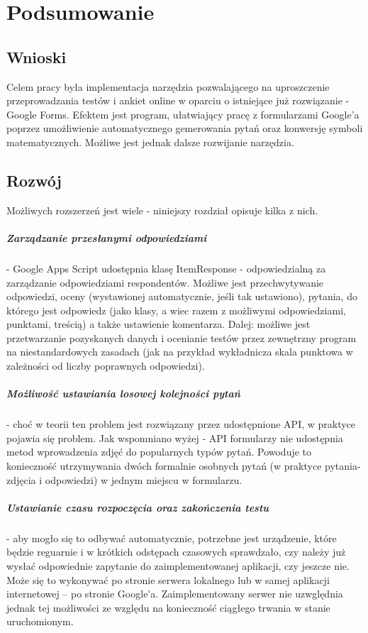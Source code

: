 \chapter{Podsumowanie}%

\section{Wnioski}
Celem pracy była implementacja narzędzia pozwalającego na uproszczenie przeprowadzania testów i ankiet online w oparciu o istniejące już rozwiązanie - Google Forms.  Efektem jest program, ułatwiający pracę z formularzami Google'a poprzez umożliwienie automatycznego gemerowania pytań oraz konwersję symboli matematycznych.  Możliwe jest jednak dalsze rozwijanie narzędzia. 

\section{Rozwój}
Możliwych rozszerzeń jest wiele - niniejszy rozdział opisuje kilka z nich.
\paragraph{Zarządzanie przesłanymi odpowiedziami} - Google Apps Script udostępnia klasę ItemResponse - odpowiedzialną za zarządzanie odpowiedziami respondentów. Możliwe jest przechwytywanie odpowiedzi, oceny (wystawionej automatycznie, jeśli tak ustawiono), pytania, do którego jest odpowiedz (jako klasy, a wiec razem z możliwymi odpowiedziami, punktami, treścią) a także ustawienie komentarza. Dalej: możliwe jest przetwarzanie pozyskanych danych i ocenianie testów przez zewnętrzny program na niestandardowych zasadach (jak na przykład wykładnicza skala punktowa w zależności od liczby poprawnych odpowiedzi).
\paragraph{Możliwość ustawiania losowej kolejności pytań} - choć w teorii ten problem jest rozwiązany przez udostępnione API, w praktyce pojawia się problem. Jak wspomniano wyżej - API formularzy nie udostępnia metod wprowadzenia zdjęć do popularnych typów pytań. Powoduje to konieczność utrzymywania dwóch formalnie osobnych pytań (w praktyce pytania-zdjęcia i odpowiedzi) w jednym miejscu w formularzu.
\paragraph{Ustawianie czasu rozpoczęcia oraz zakończenia testu} - aby mogło się to odbywać automatycznie, potrzebne jest urządzenie, które będzie reguarnie i w krótkich odstępach czasowych sprawdzało, czy należy już wysłać odpowiednie zapytanie do zaimplementowanej aplikacji, czy jeszcze nie. Może się to wykonywać po stronie serwera lokalnego lub w samej aplikacji internetowej -- po stronie Google'a. Zaimplementowany serwer nie uzwględnia jednak tej możliwości ze względu na konieczność ciągłego trwania w stanie uruchomionym. 



